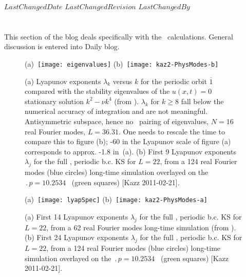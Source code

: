 \ifsvnmulti
 {$LastChangedDate$}
 {$LastChangedRevision$} {$LastChangedBy$}
\fi

\chapter{\KS}
\label{sect:LyapKS}

This section of the blog deals specifically with the
\KS\ calculations. General discussion is entered into
 {Daily blog}.

\begin{figure}
 (a)~\texttt{[image: eigenvalues]}
 (b)~\texttt{[image: kaz2-PhysModes-b]}
\caption{
(a)
Lyapunov exponents $\lambda_k$ versus $k$ for the periodic
orbit $\overline{1}$ compared with  the stability eigenvalues
of the $u(x,t)=0$ stationary solution $k^2- \nu k^4$ (from
). $\lambda_k$ for $k \geq 8$ fall
below the numerical accuracy of integration and are not
meaningful. Antisymmetric subspace,
hence no \ pairing of eigenvalues, $N=16$ real Fourier
modes, $L=36.31$. One needs to rescale the time to compare
this to figure (b); -60 in the Lyapunov scale of figure (a)
corresponds to approx. -1.8 in \,(a).
(b)
First 9 Lyapunov exponents $\lambda_j$ for the full
\statesp, periodic b.c. KS for $L=22$, from a 124 real Fourier
modes (blue circles) long-time simulation overlayed on
the $\period{p}=10.2534$ \po\ (green squares) [Kazz 2011-02-21].
}
\label{fig:lyapSpec1}
\end{figure}

\begin{figure}
 (a)~\texttt{[image: lyapSpec]}
 (b)~\texttt{[image: kaz2-PhysModes-a]}
\caption{
(a)
First 14 Lyapunov exponents $\lambda_j$ for the full
\statesp, periodic b.c. KS for $L=22$, from a 62 real Fourier
modes long-time simulation (from ).
(b)
First 24 Lyapunov exponents $\lambda_j$ for the full
\statesp, periodic b.c. KS for $L=22$, from a 124 real Fourier
modes (blue circles) long-time simulation overlayed on
the $\period{p}=10.2534$ \po\ (green squares) [Kazz 2011-02-21].
}
\label{fig:lyapSpec}
\end{figure}

